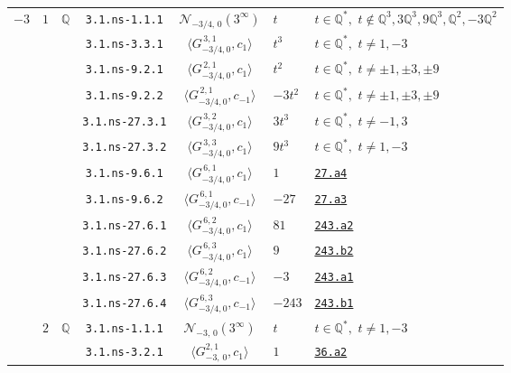 \documentclass[11pt]{amsart}
\newcommand{\eclabel}[1]{\href{https://www.lmfdb.org/EllipticCurve/Q/#1}{\texttt{#1}}}
\theoremstyle{definition}
\newcommand{\Q}{\mathbb Q}
\newcommand{\QQ}{\mathbb Q}
\begin{document}
{\begin{longtable}{|c|c|c|c|c|l|l|}
{$-3$} & {$1$} & {$\QQ$} 
& \texttt{3.1.ns-1.1.1} & $\mathcal N_{-3/4,\,0}(3^{\infty})$ &   $t$ &  $t\in \Q^*,\,\,t\not\in \Q^3,3\Q^3,9\Q^3,\Q^2,-3\Q^2 $ \\ \cline{4-7} 
& & &  \texttt{3.1.ns-3.3.1} & $\langle G^{\, 3,1}_{-3/4,0},c_{1}\rangle$  &  $t^3$ & $t\in \Q^*,\,\,t\ne 1,-3$ \\  \cline{4-7}   
& &  & \texttt{3.1.ns-9.2.1} & $\langle G^{\, 2,1}_{-3/4,0},c_{1}\rangle$  & $t^2$  & $t\in \Q^*,\,\,t\ne \pm 1,\pm 3,\pm 9$ \\  \cline{4-7}  
& &&\texttt{3.1.ns-9.2.2} & $\langle G^{\, 2,1}_{-3/4,0},c_{-1}\rangle$  & $-3t^2$  & $t\in \Q^*,\,\,t\ne \pm 1,\pm 3,\pm 9$ \\ \cline{4-7}  
& &&\texttt{3.1.ns-27.3.1} & $\langle G^{\, 3,2}_{-3/4,0},c_{1}\rangle$  & $3t^3$  &  $t\in \Q^*,\,\,t\ne -1,3$\\  \cline{4-7}  
& &&\texttt{3.1.ns-27.3.2} & $\langle G^{\, 3,3}_{-3/4,0},c_{1}\rangle$  & $9t^3$ &   $t\in \Q^*,\,\,t\ne 1,-3$ \\ \cline{4-7}   
& &&\texttt{3.1.ns-9.6.1} & $\langle G^{\, 6,1}_{-3/4,0},c_{1}\rangle$ & $1$  & \eclabel{27.a4}\\  \cline{4-7}   
& &&\texttt{3.1.ns-9.6.2} & $\langle G^{\, 6,1}_{-3/4,0},c_{-1}\rangle$ &  $-27$  & \eclabel{27.a3} \\  \cline{4-7}  
& &&\texttt{3.1.ns-27.6.1} & $\langle G^{\, 6,2}_{-3/4,0},c_{1}\rangle$ &  $81$  & \eclabel{243.a2}  \\  \cline{4-7}   
& &&\texttt{3.1.ns-27.6.2} & $\langle G^{\, 6,3}_{-3/4,0},c_{1}\rangle$ &  $9$  & \eclabel{243.b2} \\  \cline{4-7}   
& &&\texttt{3.1.ns-27.6.3} & $\langle G^{\, 6,2}_{-3/4,0},c_{-1}\rangle$ &  $-3$ &\eclabel{243.a1} \\ \cline{4-7}  
& &&\texttt{3.1.ns-27.6.4} & $\langle G^{\, 6,3}_{-3/4,0},c_{-1}\rangle$ & $-243$ & \eclabel{243.b1}\\ \cline{2-7} 
& {$2$}   & {$\QQ$}  
 & \texttt{3.1.ns-1.1.1} & $\mathcal{N}_{-3,\,0}(3^{\infty})$ &   $t$ &  $t\in \Q^*,\,\,t\ne 1,-3 $ \\ \cline{4-7} 
 & &  & \texttt{3.1.ns-3.2.1} & $\langle G^{2,1}_{-3,\,0},c_{1}\rangle$ &   $1$ &  \eclabel{36.a2}  \\ \cline{4-7}  

\end{longtable}}
\end{document}
